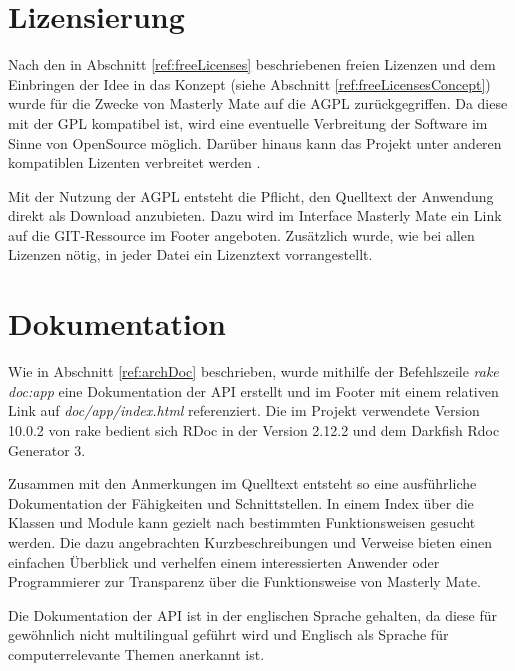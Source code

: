 \section{Lizensierung}
Nach den in Abschnitt \ref{ref:freeLicenses} beschriebenen freien Lizenzen und
dem Einbringen der Idee in das Konzept (siehe Abschnitt
\ref{ref:freeLicensesConcept}) wurde für die Zwecke von Masterly Mate auf die
\ac{AGPL} zurückgegriffen. Da diese mit der \ac{GPL} kompatibel ist, wird
eine eventuelle Verbreitung der Software im Sinne von OpenSource möglich.
Darüber hinaus kann das Projekt unter anderen kompatiblen Lizenten verbreitet
werden \cite{fsf:2007}.

Mit der Nutzung der AGPL entsteht die Pflicht, den Quelltext der Anwendung
direkt als Download anzubieten. Dazu wird im Interface Masterly Mate
ein Link auf die GIT-Ressource im Footer angeboten. Zusätzlich wurde, wie bei
allen Lizenzen nötig, in jeder Datei ein Lizenztext vorrangestellt.

\section{Dokumentation}
Wie in Abschnitt \ref{ref:archDoc} beschrieben, wurde mithilfe der Befehlszeile
\textit{rake doc:app} eine Dokumentation der API erstellt und im Footer
mit einem relativen Link auf \textit{doc/app/index.html} referenziert. Die im
Projekt verwendete Version 10.0.2 von rake bedient sich RDoc in der Version
2.12.2 und dem Darkfish Rdoc Generator 3.

Zusammen mit den Anmerkungen im Quelltext entsteht so eine ausführliche
Dokumentation der Fähigkeiten und Schnittstellen. In einem Index über die
Klassen und Module kann gezielt nach bestimmten Funktionsweisen gesucht werden.
Die dazu angebrachten Kurzbeschreibungen und Verweise bieten einen einfachen
Überblick und verhelfen einem interessierten Anwender oder Programmierer zur
Transparenz über die Funktionsweise von Masterly Mate.

Die Dokumentation der API ist in der englischen Sprache gehalten, da diese für
gewöhnlich nicht multilingual geführt wird und Englisch als Sprache für
computerrelevante Themen anerkannt ist.

